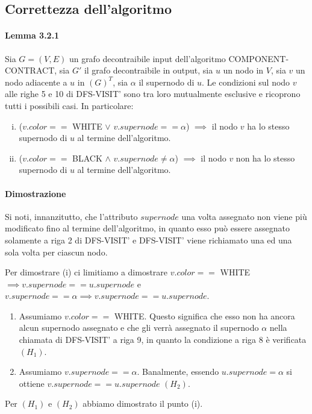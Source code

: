     \subsection{Correttezza dell'algoritmo}\label{subsec:correttezza-dell'algoritmo}

    \paragraph{Lemma 3.2.1}
    Sia $G=(V,E)$ un grafo decontraibile input dell'algoritmo COMPONENT-CONTRACT, sia $G\mathcal{'}$ il grafo decontraibile
    in output, sia $u$ un nodo in $V$, sia $v$ un nodo adiacente a $u$ in $(G)^T$, sia $\alpha$ il supernodo di $u$.
    Le condizioni sul nodo $v$ alle righe 5 e 10 di DFS-VISIT' sono tra loro mutualmente esclusive e ricoprono tutti i
    possibili casi.
    In particolare:
    \begin{enumerate}[(i)]
        \item ($v.color ==$ WHITE $\vee$ $v.supernode == \alpha$) $\implies$ il nodo $v$ ha lo stesso supernodo di $u$ al
        termine dell'algoritmo.
        \item ($v.color ==$ BLACK $\wedge$ $v.supernode \ne \alpha$) $\implies$ il nodo $v$ non ha lo stesso supernodo di
        $u$ al termine dell'algoritmo.
    \end{enumerate}

    \paragraph{Dimostrazione}
    Si noti, innanzitutto, che l'attributo $supernode$ una volta assegnato non viene pi\`u modificato fino al termine
    dell'algoritmo, in quanto esso pu\`o essere assegnato solamente a riga 2 di DFS-VISIT' e DFS-VISIT' viene richiamato
    una ed una sola volta per ciascun nodo. \newline

    Per dimostrare (i) ci limitiamo a dimostrare $v.color ==$ WHITE $ \implies v.supernode == u.supernode$ e
    $v.supernode == \alpha \implies v.supernode == u.supernode$.
    \begin{enumerate}
        \item Assumiamo $v.color ==$ WHITE. Questo significa che esso non ha ancora alcun supernodo assegnato e che gli 
		verr\`a assegnato il supernodo $\alpha$ nella chiamata di DFS-VISIT' a riga 9, in quanto la condizione a riga 8
        \`e verificata $(H_1)$.
        \item Assumiamo $v.supernode == \alpha$.
        Banalmente, essendo $u.supernode = \alpha$ si ottiene $v.supernode == u.supernode$ $(H_2)$.
    \end{enumerate}
    Per $(H_1)$ e $(H_2)$ abbiamo dimostrato il punto (i).

